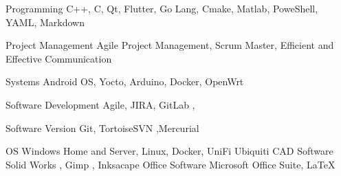 

\begin{cvskills}

  \cvskill
    {Programming} %
    {C++, C, Qt, Flutter, Go Lang, Cmake, Matlab, PoweShell, YAML, Markdown 
} %

  \cvskill
    {Project Management} %
    {Agile Project Management, Scrum Master, Efficient and Effective Communication
} 


  \cvskill
    {Systems} %
    {Android OS, Yocto, Arduino, Docker, OpenWrt} %

  \cvskill
    {Software Development} %
    {Agile, JIRA, GitLab , } %
    
  \cvskill
    {Software Version} %
    {Git, TortoiseSVN ,Mercurial} %

  \cvskill
    {OS} %
    {Windows Home and Server, Linux, Docker, UniFi Ubiquiti } %
  \cvskill
    {CAD Software} %
    {Solid Works , Gimp , Inksacape} %
  \cvskill
    {Office Software} %
    {Microsoft Office Suite, LaTeX} %

\end{cvskills}

